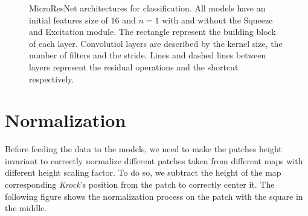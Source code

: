 \documentclass[../document.tex]{subfiles}
\begin{document}
\begin{figure}[htbp]
\begin{subfigure}[b]{0.22\textwidth}
    \end{subfigure} 
    \caption{MicroResNet architectures for classification. All models have an initial features size of $16$ and $n=1$ with and without the Squeeze and Excitation module. The rectangle represent the building block of each layer. Convolutiol layers are described by the kernel size, the number of filters and the stride. Lines and dashed lines between layers represent the residual operations and the shortcut respectively.}
    \label{fig : microresnet}
\end{figure}

\section{Normalization}
Before feeding the data to the models, we need to make the patches height invariant to correctly normalize different patches taken from different maps with different height scaling factor. To do so, we subtract the height of the map corresponding \emph{Krock}'s position from the patch to correctly center it. The following figure shows the normalization process on the patch with the square in the middle.
\end{document}
